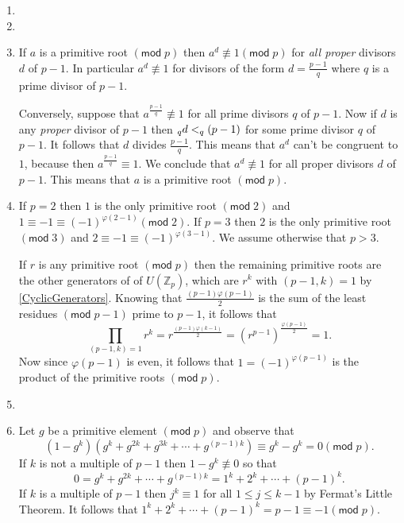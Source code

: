\documentclass[12pt]{article}
\renewcommand{\pmod}[1]{\left(\mathsf{mod}\;#1\right)}
\let\ord\relax\DeclareMathOperator{\ord}{\mathsf{ord}}
\begin{document}
\begin{enumerate}
\item %
\item %

\item %
If $a$ is a primitive root $\pmod{p}$ then $a^d\not\equiv 1\pmod{p}$
for {\em all proper} divisors $d$ of $p-1$. In particular $a^d\not\equiv 1$
for divisors of the form $d=\frac{p-1}{q}$ where $q$ is a prime divisor
of $p-1$.

Conversely, suppose that $a^{\frac{p-1}{q}}\not\equiv 1$
for all prime divisors
$q$ of $p-1$. Now if $d$ is any {\em proper} divisor of $p-1$ then
$\ord_q{d}<\ord_q\left(p-1\right)$ for some prime divisor $q$ of $p-1$.
It follows that $d$ divides $\frac{p-1}{q}$. This means that $a^d$ can't be
congruent to $1$, because then $a^{\frac{p-1}{q}}\equiv 1$.
We conclude that $a^d\not\equiv 1$ for all proper divisors $d$ of
$p-1$. This means that $a$ is a primitive root $\pmod{p}$.

\item %
If $p=2$ then $1$ is the only primitive root $\pmod{2}$
and $1\equiv -1\equiv\left(-1\right)^{\varphi\left(2-1\right)}
\pmod{2}$.
If $p=3$ then $2$ is the only primitive root $\pmod{3}$
and $2\equiv -1\equiv\left(-1\right)^{\varphi\left(3-1\right)}$.
We assume otherwise that $p>3$.

If $r$ is any primitive root $\pmod{p}$ then the remaining
primitive roots are the other generators of 
of $U\left(\mathbb{Z}_p\right)$,
which are $r^k$ with $\left(p-1,k\right)=1$ by \autoref{CyclicGenerators}.
Knowing that $\frac{\left(p-1\right)\varphi\left(p-1\right)}{2}$
is the sum of the least residues $\pmod{p-1}$
prime to $p-1$, it follows that
\[\prod_{\left(p-1,k\right)=1}r^k
=r^{\frac{\left(p-1\right)\varphi\left(k-1\right)}{2}}
=\left(r^{p-1}\right)^{\frac{\varphi\left(p-1\right)}{2}}=1.\]
Now since $\varphi\left(p-1\right)$ is even, it follows that
$1=\left(-1\right)^{\varphi\left(p-1\right)}$ is the product
of the primitive roots $\pmod{p}$.

\item %
\item %
Let $g$ be a primitive element $\pmod{p}$ and observe that
\begin{equation}\label{PowerSum}
\left(1-g^k\right)\left(g^k+g^{2k}+g^{3k}+\cdots
+g^{\left(p-1\right)k}\right)
\equiv g^k-g^k=0\pmod{p}.
\end{equation}
If $k$ is not a multiple of $p-1$ then $1-g^k\not\equiv 0$
so that \[0=g^k+g^{2k}+\cdots+g^{\left(p-1\right)k}
=1^k+2^k+\cdots+\left(p-1\right)^k.\]
If $k$ is a multiple of $p-1$ then $j^k\equiv 1$ for all
$1\le j\le k-1$ by Fermat's Little Theorem.
It follows that $1^k+2^k+\cdots+\left(p-1\right)^k=p-1
\equiv -1\pmod{p}$.


\end{enumerate}
\end{document}
